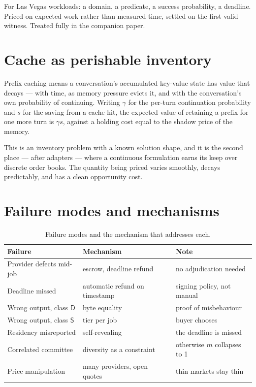 \documentclass[11pt,a4paper]{article}
\begin{document}
For Las Vegas workloads: a domain, a predicate, a success probability, a
deadline. Priced on expected work rather than measured time, settled on the first
valid witness. Treated fully in the companion paper.

\section{Cache as perishable inventory}

Prefix caching means a conversation's accumulated key-value state has value that
decays --- with time, as memory pressure evicts it, and with the conversation's
own probability of continuing. Writing $\gamma$ for the per-turn continuation
probability and $s$ for the saving from a cache hit, the expected value of
retaining a prefix for one more turn is $\gamma s$, against a holding cost equal
to the shadow price of the memory.

This is an inventory problem with a known solution shape, and it is the second
place --- after adapters --- where a continuous formulation earns its keep over
discrete order books. The quantity being priced varies smoothly, decays
predictably, and has a clean opportunity cost.

\section{Failure modes and mechanisms}

\begin{table}[h]
\centering
\begin{tabular}{lll}
\toprule
Failure & Mechanism & Note \\
\midrule
Provider defects mid-job & escrow, deadline refund & no adjudication needed \\
Deadline missed & automatic refund on timestamp & signing policy, not manual \\
Wrong output, class $\mathsf{D}$ & byte equality & proof of misbehaviour \\
Wrong output, class $\mathsf{S}$ & tier per job & buyer chooses \\
Residency misreported & self-revealing & the deadline is missed \\
Correlated committee & diversity as a constraint & otherwise $m$ collapses to 1 \\
Price manipulation & many providers, open quotes & thin markets stay thin \\
\bottomrule
\end{tabular}
\caption{Failure modes and the mechanism that addresses each.}
\end{table}
\end{document}
